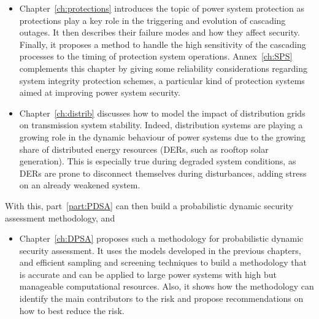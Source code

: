 \begin{itemize}
    \item Chapter~\ref{ch:protections} introduces the topic of power system protection as protections play a key role in the triggering and evolution of cascading outages. It then describes their failure modes and how they affect security. Finally, it proposes a method to handle the high sensitivity of the cascading processes to the timing of protection system operations. Annex~\ref{ch:SPS} complements this chapter by giving some reliability considerations regarding system integrity protection schemes, a particular kind of protection systems aimed at improving power system security.
    \item Chapter~\ref{ch:distrib} discusses how to model the impact of distribution grids on transmission system stability. Indeed, distribution systems are playing a growing role in the dynamic behaviour of power systems due to the growing share of distributed energy resources (DERs, such as rooftop solar generation). This is especially true during degraded system conditions, as DERs are prone to disconnect themselves during disturbances, adding stress on an already weakened system.
\end{itemize}

With this, part~\ref{part:PDSA} can then build a probabilistic dynamic security assessment methodology, and

\begin{itemize}
    \item Chapter~\ref{ch:DPSA} proposes such a methodology for probabilistic dynamic security assessment. It uses the models developed in the previous chapters, and efficient sampling and screening techniques to build a methodology that is accurate and can be applied to large power systems with high but manageable computational resources. Also, it shows how the methodology can identify the main contributors to the risk and propose recommendations on how to best reduce the risk.
\end{itemize}

